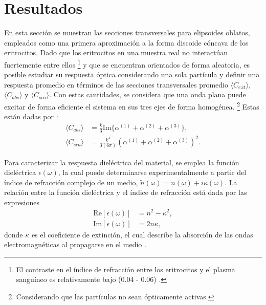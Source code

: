 \section{Resultados}
En esta sección se muestran las secciones transversales para elipsoides oblatos, empleados como una primera aproximación a la forma discoide cóncava de los eritrocitos. Dado que los eritrocitos en una muestra real no interactúan fuertemente entre ellos \footnote{El contraste en el índice de refracción entre los eritrocitos y el plasma sanguíneo es relativamente bajo (0.04 - 0.06) \cite{RefracIndBlood}.} y que se encuentran orientados de forma aleatoria, es posible estudiar su respuesta óptica considerando una sola partícula y definir una respuesta promedio en términos de las secciones transversales promedio $\langle C_{ext} \rangle$, $\langle C_{abs} \rangle$ y $\langle C_{sca} \rangle$. Con estas cantidades, se considera que una onda plana puede excitar de forma eficiente el sistema en sus tres ejes de forma homogénea. \footnote{Considerando que las partículas no sean ópticamente activas.} Estas están dadas por \cite{Bohren}:
\begin{align*}
	\langle C_{abs}\rangle &= \frac{k}{3} \text{Im}\{\alpha^{(1)}+\alpha^{(2)}+\alpha^{(3)}\},\\
	\langle C_{sca}\rangle &= \frac{k^4}{3(6\pi)} \left(\alpha^{(1)}+\alpha^{(2)}+\alpha^{(3)}\right)^2.
\end{align*}

Para caracterizar la respuesta dieléctrica del material, se emplea la función dieléctrica $\epsilon(\omega)$, la cual puede determinarse experimentalmente a partir del índice de refracción complejo de un medio, $\tilde{n}(\omega) = n(\omega) + i\kappa(\omega)$. La relación entre la función dieléctrica y el índice de refracción está dada por las expresiones \cite{Plasmonics}
\begin{align} 
	\text{Re}[\epsilon(\omega)] &= n^2 - \kappa^2,\\
	\text{Im}[\epsilon(\omega)] &= 2n\kappa, \end{align}
donde $\kappa$ es el coeficiente de extinción, el cual describe la absorción de las ondas electromagnéticas al propagarse en el medio \cite{Plasmonics}.\\

